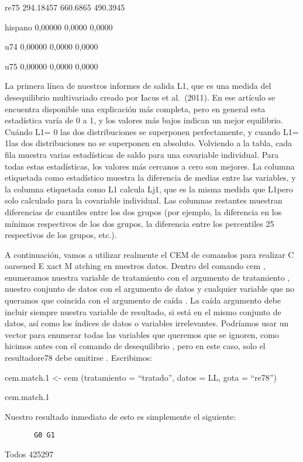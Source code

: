 \documentclass[
]{book}
\begin{document}
re75 294.18457 660.6865 490.3945

hispano 0,00000 0,0000 0,0000

u74 0,00000 0,0000 0,0000

u75 0,00000 0,0000 0,0000

La primera línea de nuestros informes de salida L1, que es una medida del desequilibrio multivariado creado por Iacus et al.~(2011). En ese artículo se encuentra disponible una explicación más completa, pero en general esta estadística varía de 0 a 1, y los valores más bajos indican un mejor equilibrio. Cuándo L1= 0 las dos distribuciones se superponen perfectamente, y cuando L1= 1las dos distribuciones no se superponen en absoluto. Volviendo a la tabla, cada fila muestra varias estadísticas de saldo para una covariable individual. Para todas estas estadísticas, los valores más cercanos a cero son mejores. La columna etiquetada como estadístico muestra la diferencia de medias entre las variables, y la columna etiquetada como L1 calcula Lj1, que es la misma medida que L1pero solo calculado para la covariable individual. Las columnas restantes muestran diferencias de cuantiles entre los dos grupos (por ejemplo, la diferencia en los mínimos respectivos de los dos grupos, la diferencia entre los percentiles 25 respectivos de los grupos, etc.).

A continuación, vamos a utilizar realmente el CEM de comandos para realizar C oarsened E xact M atching en nuestros datos. Dentro del comando cem , enumeramos nuestra variable de tratamiento con el argumento de tratamiento , nuestro conjunto de datos con el argumento de datos y cualquier variable que no queramos que coincida con el argumento de caída . La caída argumento debe incluir siempre nuestra variable de resultado, si está en el mismo conjunto de datos, así como los índices de datos o variables irrelevantes. Podríamos usar un vector para enumerar todas las variables que queremos que se ignoren, como hicimos antes con el comando de desequilibrio , pero en este caso, solo el resultadore78 debe omitirse . Escribimos:

cem.match.1 \textless- cem (tratamiento = ``tratado'', datos = LL, gota = ``re78'')

cem.match.1

Nuestro resultado inmediato de esto es simplemente el siguiente:

\begin{verbatim}
       G0 G1
\end{verbatim}

Todos 425297
\end{document}
